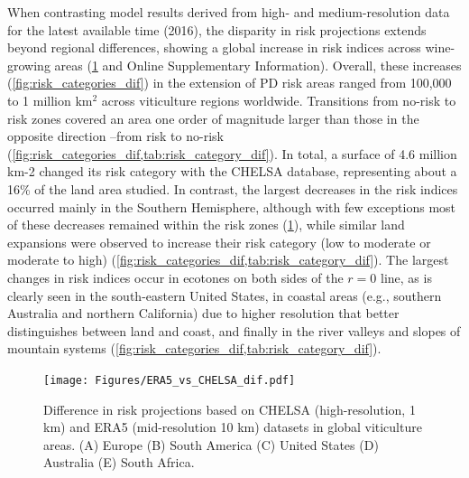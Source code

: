 When contrasting model results derived from high- and medium-resolution
data for the latest available time (2016), the disparity in risk projections
extends beyond regional differences, showing a global increase in risk indices
across wine-growing areas (\cref{fig:risk_indices_dif} and
Online Supplementary Information).  Overall, these increases
(\cref{fig:risk_categories_dif}) in the extension of PD risk areas ranged from
100,000 to 1 million km$^2$ across viticulture regions worldwide. Transitions
from no-risk to risk zones covered an area one order of magnitude larger than
those in the opposite direction --from risk to no-risk
(\cref{fig:risk_categories_dif,tab:risk_category_dif}). In total, a surface of
4.6 million km-2 changed its risk category with the CHELSA database,
representing about a 16\% of the land area studied. In contrast, the largest
decreases in the risk indices occurred mainly in the Southern Hemisphere,
although with few exceptions most of these decreases remained within the risk
zones (\cref{fig:risk_indices_dif}), while similar land expansions were
observed to  increase their risk category (low to moderate or moderate to high)
(\cref{fig:risk_categories_dif,tab:risk_category_dif}). The largest changes in
risk indices occur in ecotones on both sides of the $r=0$ line, as is clearly
seen in the south-eastern United States, in coastal areas (e.g., southern
Australia and northern California) due to higher resolution that better
distinguishes between land and coast, and finally in the river valleys and
slopes of mountain systems
(\cref{fig:risk_categories_dif,tab:risk_category_dif}).

\begin{figure}[H]
    \centering
    \texttt{[image: Figures/ERA5\_vs\_CHELSA\_dif.pdf]}
    \caption{Difference in risk projections based on CHELSA
        (high-resolution, 1 km) and ERA5 (mid-resolution 10 km) datasets in
        global
        viticulture areas. (A) Europe (B) South America (C) United States (D)
        Australia
        (E) South Africa.}
    \label{fig:risk_indices_dif}
\end{figure}

